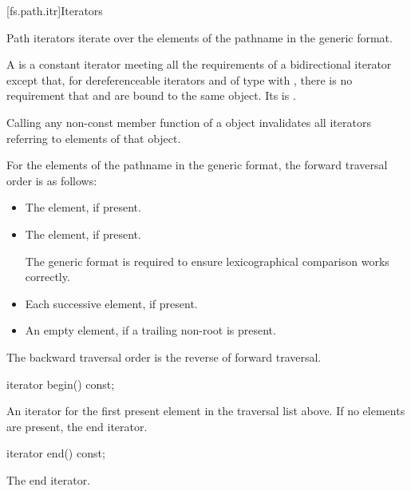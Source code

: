 [fs.path.itr]{Iterators}

%
\pnum
Path iterators iterate over the elements of the pathname
in the generic format.

\pnum
A  is a constant iterator meeting all the
requirements of a bidirectional iterator
except that,
for dereferenceable iterators  and 
of type 
with ,
there is no requirement that  and 
are bound to the same object.
Its  is .

\pnum
Calling any non-const member function of a  object
invalidates all iterators referring to elements of that object.

\pnum
For the elements of the pathname in the generic format,
the forward traversal order is as follows:
\begin{itemize}
\item The  element, if present.
\item The  element, if present.
\begin{note}
The generic format is required to ensure lexicographical
comparison works correctly.
\end{note}
\item Each successive  element, if present.
\item An empty element, if a trailing non-root 
is present.
\end{itemize}

\pnum
The backward traversal order is the reverse of forward traversal.

%
\begin{itemdecl}
iterator begin() const;
\end{itemdecl}

\begin{itemdescr}
\pnum
\returns
An iterator for the first present element in the traversal
list above. If no elements are present, the end iterator.
\end{itemdescr}

%
\begin{itemdecl}
iterator end() const;
\end{itemdecl}

\begin{itemdescr}
\pnum
\returns
The end iterator.
\end{itemdescr}

